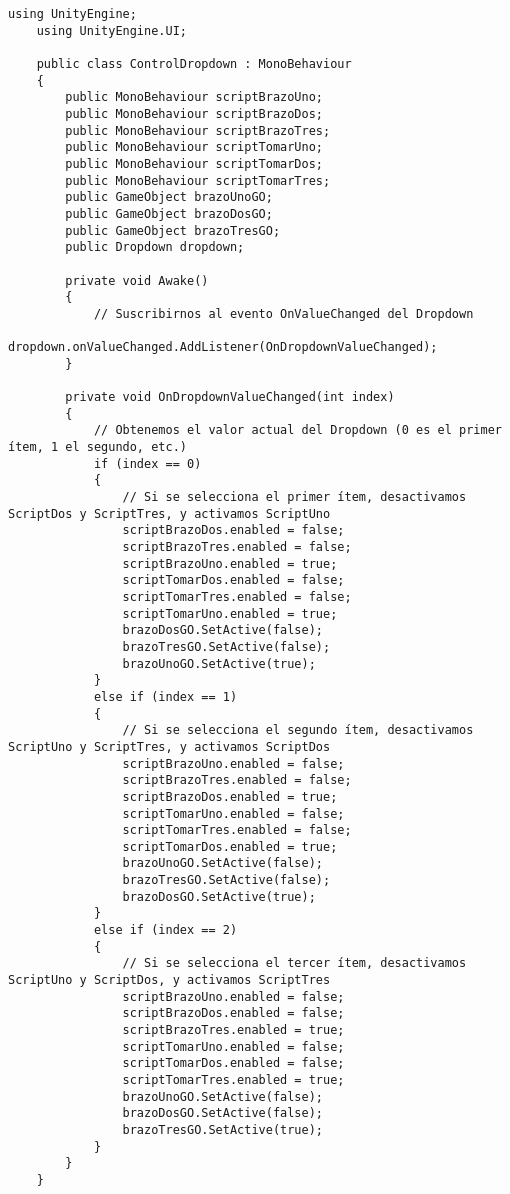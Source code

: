 \begin{lstlisting}[frame=single]
    using UnityEngine;
    using UnityEngine.UI;

    public class ControlDropdown : MonoBehaviour
    {
        public MonoBehaviour scriptBrazoUno;
        public MonoBehaviour scriptBrazoDos;
        public MonoBehaviour scriptBrazoTres;
        public MonoBehaviour scriptTomarUno;
        public MonoBehaviour scriptTomarDos;
        public MonoBehaviour scriptTomarTres;
        public GameObject brazoUnoGO;
        public GameObject brazoDosGO;
        public GameObject brazoTresGO;
        public Dropdown dropdown;

        private void Awake()
        {
            // Suscribirnos al evento OnValueChanged del Dropdown
            dropdown.onValueChanged.AddListener(OnDropdownValueChanged);
        }

        private void OnDropdownValueChanged(int index)
        {
            // Obtenemos el valor actual del Dropdown (0 es el primer ítem, 1 el segundo, etc.)
            if (index == 0)
            {
                // Si se selecciona el primer ítem, desactivamos ScriptDos y ScriptTres, y activamos ScriptUno
                scriptBrazoDos.enabled = false;
                scriptBrazoTres.enabled = false;
                scriptBrazoUno.enabled = true;
                scriptTomarDos.enabled = false;
                scriptTomarTres.enabled = false;
                scriptTomarUno.enabled = true;
                brazoDosGO.SetActive(false);
                brazoTresGO.SetActive(false);
                brazoUnoGO.SetActive(true);
            }
            else if (index == 1)
            {
                // Si se selecciona el segundo ítem, desactivamos ScriptUno y ScriptTres, y activamos ScriptDos
                scriptBrazoUno.enabled = false;
                scriptBrazoTres.enabled = false;
                scriptBrazoDos.enabled = true;
                scriptTomarUno.enabled = false;
                scriptTomarTres.enabled = false;
                scriptTomarDos.enabled = true;
                brazoUnoGO.SetActive(false);
                brazoTresGO.SetActive(false);
                brazoDosGO.SetActive(true);
            }
            else if (index == 2)
            {
                // Si se selecciona el tercer ítem, desactivamos ScriptUno y ScriptDos, y activamos ScriptTres
                scriptBrazoUno.enabled = false;
                scriptBrazoDos.enabled = false;
                scriptBrazoTres.enabled = true;
                scriptTomarUno.enabled = false;
                scriptTomarDos.enabled = false;
                scriptTomarTres.enabled = true;
                brazoUnoGO.SetActive(false);
                brazoDosGO.SetActive(false);
                brazoTresGO.SetActive(true);
            }
        }
    }
\end{lstlisting}